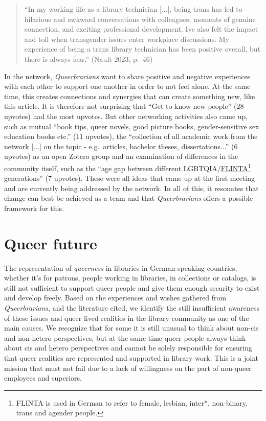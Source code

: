 \documentclass[a4paper,
fontsize=11pt,
oneside,
numbers=noperiodatend,
parskip=half-,
bibliography=totoc,
final
]{scrartcl}
\begin{document}
\begin{quote}
\enquote{In my working life as a library technician {[}...{]}, being trans has
led to hilarious and awkward conversations with colleagues, moments of
genuine connection, and exciting professional development.
I\textquotesingle ve also felt the impact and toll when transgender
issues enter workplace discussions. My experience of being a trans
library technician has been positive overall, but there is always fear.}
(Nault 2023, p.~46)
\end{quote}

In the network, \emph{Queerbrarians} want to share positive and negative
experiences with each other to support one another in order to not feel
alone. At the same time, this creates connections and synergies that can
create something new, like this article. It is therefore not surprising
that \enquote{Get to know new people} (28 upvotes) had the most upvotes. But
other networking activities also came up, such as mutual \enquote{book tips,
queer novels, good picture books, gender-sensitive sex education books
etc.} (11 upvotes), the \enquote{collection of all academic work from the
network {[}...{]} on the topic - e.g.~articles, bachelor theses,
dissertations...} (6 upvotes) as an open Zotero group and an examination
of differences in the community itself, such as the \enquote{age gap between
different
LGBTQIA/\href{https://en.wikipedia.org/wiki/FLINTA*}{FLINTA}\footnote{FLINTA
  is used in German to refer to female, lesbian, inter*, non-binary,
  trans and agender people.} generations} (7 upvotes). These were all
ideas that came up at the first meeting and are currently being
addressed by the network. In all of this, it resonates that change can
best be achieved as a team and that \emph{Queerbrarians} offers a
possible framework for this.

\hypertarget{queer-future}{%
\section{Queer future}\label{queer-future}}

The representation of \emph{queerness} in libraries in German-speaking
countries, whether it's for patrons, people working in libraries, in
collections or catalogs, is still not sufficient to support queer people
and give them enough security to exist and develop freely. Based on the
experiences and wishes gathered from \emph{Queerbrarians}, and the
literature cited, we identify the still insufficient awareness of these
issues and queer lived realities in the library community as one of the
main causes. We recognize that for some it is still unusual to think
about non-cis and non-hetero perspectives, but at the same time queer
people always think about cis and hetero perspectives and cannot be
solely responsible for ensuring that queer realities are represented and
supported in library work. This is a joint mission that must not fail
due to a lack of willingness on the part of non-queer employees and
superiors.
\end{document}
